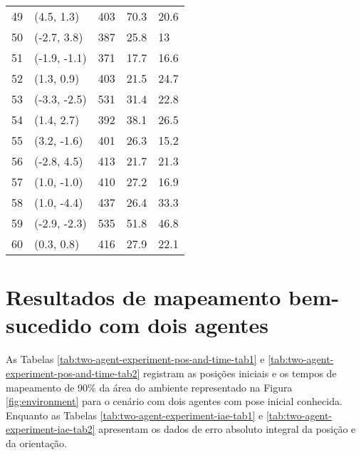 \begin{table}[]
\begin{tabularx}{\textwidth}{@{}YYYYY@{}}
49& (4.5, 1.3)&403&70.3&20.6\\
50& (-2.7, 3.8)&387&25.8&13\\
51& (-1.9, -1.1)&371&17.7&16.6\\
52& (1.3, 0.9)&403&21.5&24.7\\
53& (-3.3, -2.5)&531&31.4&22.8\\
54& (1.4, 2.7)&392&38.1&26.5\\
55& (3.2, -1.6)&401&26.3&15.2\\
56& (-2.8, 4.5)&413&21.7&21.3\\
57& (1.0, -1.0)&410&27.2&16.9\\
58& (1.0, -4.4)&437&26.4&33.3\\
59& (-2.9, -2.3)&535&51.8&46.8\\
60& (0.3, 0.8)&416&27.9&22.1
\\ \hline
\end{tabularx}
  
\end{table}

\clearpage

\section{Resultados de mapeamento bem-sucedido com dois agentes}
\label{app:two-agent-data}

As Tabelas \ref{tab:two-agent-experiment-pos-and-time-tab1} e \ref{tab:two-agent-experiment-pos-and-time-tab2} registram as posições 
iniciais e os tempos de mapeamento de 90\% da área do ambiente 
representado na Figura \ref{fig:environment} para o cenário com dois 
agentes com pose inicial conhecida. Enquanto as Tabelas \ref{tab:two-agent-experiment-iae-tab1} e \ref{tab:two-agent-experiment-iae-tab2} apresentam os dados de erro absoluto 
integral da posição e da orientação.

